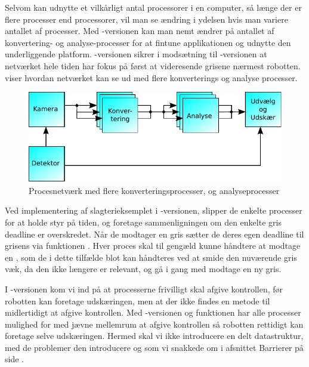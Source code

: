 Selvom \pycsp kan udnytte et vilkårligt antal processorer i en computer, så længe der er flere processer end processorer, vil man se ændring i ydelsen hvis man variere  antallet af processer. Med -versionen kan man nemt ændrer på antallet af konvertering- og analyse-processer for at fintune applikationen og  udnytte den underliggende platform. -versionen sikrer i modsætning til -versionen at netværket hele tiden har fokus på først at videresende grisene nærmest robotten.  viser hvordan netværket kan se ud med flere konverterings og analyse processer. 

\begin{figure}
 \begin{center}
  \includegraphics[scale=1]{images/pig-network3}
	\caption{Procesnetværk med flere konverteringsprocesser, og analyseprocesser}
	\label{fig:pig-network3}
\end{center}
\end{figure}

Ved implementering af slagterieksemplet i -versionen, slipper de enkelte processer for at holde styr på tiden, og foretage sammenligningen om den enkelte gris deadline er overskredet. Når de modtager en gris sætter de deres egen deadline til grisens via funktionen .  Hver proces skal til gengæld kunne håndtere at modtage en , som de i dette tilfælde blot kan håndteres ved at smide den nuværende gris væk, da den ikke længere er relevant, og  gå i gang med modtage en ny gris.

I -versionen kom vi ind på at processerne frivilligt skal afgive kontrollen, før robotten kan foretage udskæringen, men at der ikke findes en metode til midlertidigt at afgive kontrollen. Med -versionen og funktionen  har alle processer mulighed for med jævne mellemrum at afgive kontrollen så robotten rettidigt kan foretage selve udskæringen. Hermed skal vi ikke introducere en delt datastruktur, med de problemer den introducere og som vi snakkede om i afsnittet Barrierer på side \pageref{sec:barrierer}.
  
